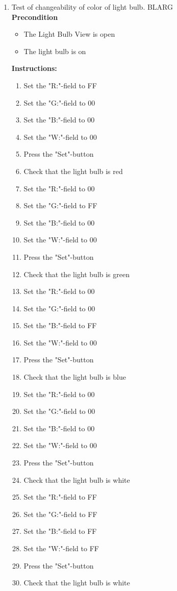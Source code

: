 \documentclass[a4paper]{article}
\newlength{\testlabellength}
\newenvironment{testlist}{\begin{enumerate}[label=\bfseries Instruction \thesubsection.\arabic* , labelindent=0pt, labelwidth=\testlabellength , leftmargin=2cm]}{\end{enumerate}}
\newenvironment{precondition}{
{\color{white}BLARG}\\ 
\textbf{Precondition}
\begin{itemize}[labelindent=0cm, labelwidth=2cm , leftmargin=1cm]
}
{\end{itemize}}
\newenvironment{instruction}{
\textbf{Instructions:}
\begin{enumerate}[label=\bfseries  \arabic*., labelindent=0cm, labelwidth=2cm , leftmargin=1cm]
}
{\end{enumerate}}
\begin{document}
\begin{appendices}
\begin{testlist}
	\item Test of changeability of color of light bulb.
		\begin{precondition}
			\item The Light Bulb View is open
			\item The light bulb is on
		\end{precondition}
		\begin{instruction}
			\item Set the "R:"-field to FF
			\item Set the "G:"-field to 00
			\item Set the "B:"-field to 00
			\item Set the "W:"-field to 00
			\item Press the "Set"-button
			\item Check that the light bulb is red
			\item Set the "R:"-field to 00
			\item Set the "G:"-field to FF
			\item Set the "B:"-field to 00
			\item Set the "W:"-field to 00
			\item Press the "Set"-button
			\item Check that the light bulb is green
			\item Set the "R:"-field to 00
			\item Set the "G:"-field to 00
			\item Set the "B:"-field to FF
			\item Set the "W:"-field to 00
			\item Press the "Set"-button
			\item Check that the light bulb is blue
			\item Set the "R:"-field to 00
			\item Set the "G:"-field to 00
			\item Set the "B:"-field to 00
			\item Set the "W:"-field to 00
			\item Press the "Set"-button
			\item Check that the light bulb is white
			\item Set the "R:"-field to FF
			\item Set the "G:"-field to FF
			\item Set the "B:"-field to FF
			\item Set the "W:"-field to FF
			\item Press the "Set"-button
			\item Check that the light bulb is white
		\end{instruction}


\end{testlist}
\end{appendices}
\end{document}
